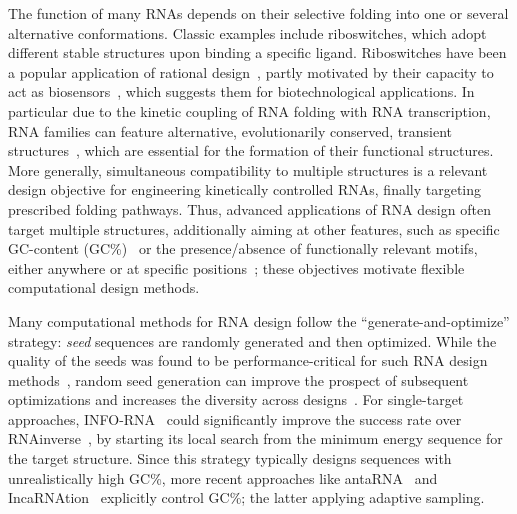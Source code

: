 \documentclass[]{bmcart}
\newcommand{\Def}[1]{\emph{#1}}
\newcommand{\parHead}[1]{\Final{\paragraph{#1}}}
\newcommand{\Final}[1]{\begingroup\color{red!70!black}#1\endgroup}
\renewcommand{\Final}[1]{}
\newcommand{\Nuc}[1]{{\sf #1}}
\newcommand{\Cb}{\Nuc{C}}
\newcommand{\Gb}{\Nuc{G}}
\newcommand{\GCb}{\Gb\Cb}
\newcommand{\Software}[1]{{\ttfamily #1}}
\newcommand{\citep}[1]{\cite{#1}}
\newcommand{\citet}[1]{\cite{#1}}
\newcommand{\revised}[1]{{\color{red} #1}}
\begin{document}
\parHead{Motivating multiple RNA design.} The function of many RNAs
depends on their selective folding into one or several alternative
conformations. Classic examples include riboswitches, which
adopt different stable structures upon binding a specific
ligand. Riboswitches have been a popular application of rational
design~\citep{Wachsmuth2013,Domin2017}, partly motivated by their
capacity to act as biosensors~\citep{Findeiss2017}, \revised{which suggests them for biotechnological applications.}
In particular due to the kinetic coupling of RNA folding with RNA transcription, RNA families can feature alternative,
evolutionarily conserved, transient structures~\citep{Zhu2013}, which
are essential for the formation of their functional structures.  More generally, simultaneous compatibility to multiple
structures is a relevant design objective for engineering kinetically
controlled RNAs, finally targeting prescribed folding pathways. Thus,
advanced applications of RNA design often target multiple structures,
additionally aiming at other features, such as specific
\GCb-content (\GCb\%)~\citet{Reinharz2013} or the presence/absence of
functionally relevant motifs, either anywhere or at specific
positions~\citep{Zhou2013}; these objectives motivate flexible
computational design methods.

\parHead{On the importance of sampling for design.}
Many computational methods for RNA design follow the ``generate-and-optimize'' strategy: \Def{seed} sequences are randomly generated and then optimized.
While the quality of the seeds was
found to be performance-critical for such RNA design
methods~\citep{Levin2012}, random seed generation
can improve the prospect of subsequent optimizations
and increases the diversity
across designs~\citep{Reinharz2013}.  For single-target approaches,
\Software{INFO-RNA}~\citep{Busch2006} could significantly improve the success rate over \Software{RNAinverse}~\citep{Hofacker1994}, by starting its local search from the minimum energy sequence
for the target structure. Since this
strategy typically designs sequences with unrealistically high
\GCb\%,
more recent approaches like \Software{antaRNA}~\citep{Kleinkauf2015} and \Software{IncaRNAtion}~\citep{Reinharz2013} explicitly control \GCb\%; the latter applying adaptive sampling.
\end{document}
